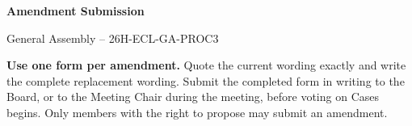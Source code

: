 \documentclass{../../Common/Latex/Templates/rapport}
\date{\meetingdate, \meetingtime}
\begin{document}
\reportmainmatter
\small
\setlength{\parindent}{0pt}
\setlength{\tabcolsep}{6pt}
\renewcommand{\arraystretch}{1.2}

\begin{center}
  {\Large\bfseries Amendment Submission}\par
  \vspace{0.15cm}
  {\normalsize General Assembly -- 26H-ECL-GA-PROC3}\par
  \vspace{0.1cm}
  {\small \meetingline}\par
\end{center}

\vspace{0.2cm}
\textbf{Use one form per amendment.} Quote the current wording exactly and write the complete replacement wording. Submit the completed form in writing to the Board, or to the Meeting Chair during the meeting, before voting on Cases begins. Only members with the right to propose may submit an amendment.
\end{document}
